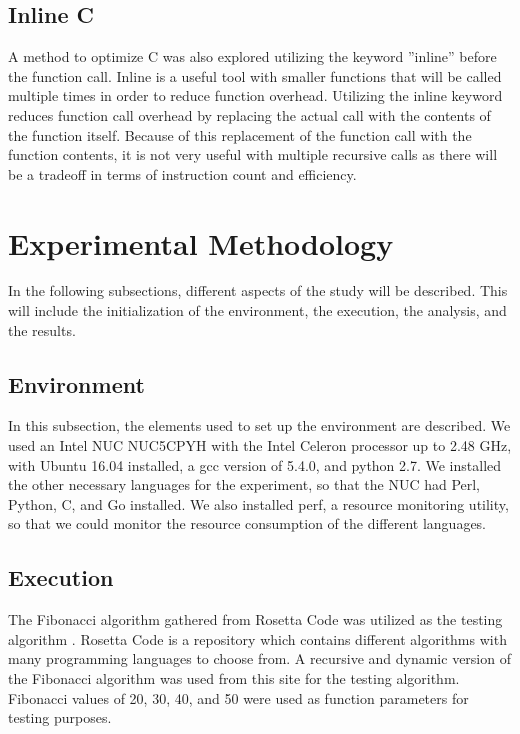 \documentclass{sig-alternate}
\begin{document}
\subsection{Inline C}

A method to optimize C was also explored utilizing the keyword ''inline'' before the function call. Inline is a useful tool with smaller functions that will be called multiple times in order to reduce function overhead. Utilizing the inline keyword reduces function call overhead by replacing the actual call with the contents of the function itself. Because of this replacement of the function call with the function contents, it is not very useful with multiple recursive calls as there will be a tradeoff in terms of instruction count and efficiency.

\section{Experimental Methodology}

In the following subsections, different aspects of the study will be described. This will include the initialization of the environment, the execution, the analysis, and the results.

\subsection{Environment}

In this subsection, the elements used to set up the environment are described. We used an Intel NUC NUC5CPYH with the Intel Celeron processor up to 2.48 GHz, with Ubuntu 16.04 installed, a gcc version of 5.4.0, and python 2.7. We installed the other necessary languages for the experiment, so that the NUC had Perl, Python, C, and Go installed. We also installed perf, a resource monitoring utility, so that we could monitor the resource consumption of the different languages. 

\subsection{Execution}

The Fibonacci algorithm gathered from Rosetta Code was utilized as the testing algorithm \cite{rosetta}. Rosetta Code is a repository which contains different algorithms with many programming languages to choose from. A recursive and dynamic version of the Fibonacci algorithm was used from this site for the testing algorithm. Fibonacci values of 20, 30, 40, and 50 were used as function parameters for testing purposes.
\end{document}
